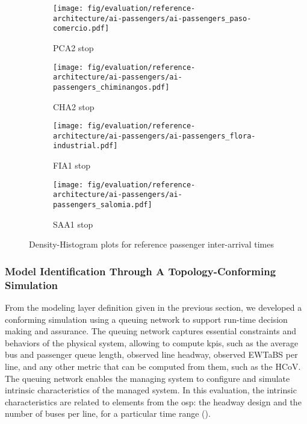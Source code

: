 \begin{figure}[h]
	\centering
	\begin{subfigure}[b]{0.23\textwidth}
		\centering
		\texttt{[image: fig/evaluation/reference-architecture/ai-passengers/ai-passengers\_paso-comercio.pdf]}
		\caption{PCA2 stop}
		\label{tab:evaluation--suts-ai-passengers_PCA2}
	\end{subfigure}
	\begin{subfigure}[b]{0.23\textwidth}
		\centering
		\texttt{[image: fig/evaluation/reference-architecture/ai-passengers/ai-passengers\_chiminangos.pdf]}
		\caption{CHA2 stop}
		\label{tab:evaluation--suts-ai-passengers_CHA2}
	\end{subfigure}
	\begin{subfigure}[b]{0.23\textwidth}
		\centering
		\texttt{[image: fig/evaluation/reference-architecture/ai-passengers/ai-passengers\_flora-industrial.pdf]}
		\caption{FIA1 stop}
		\label{tab:evaluation--suts-ai-passengers_FIA1}
	\end{subfigure}
	\begin{subfigure}[b]{0.23\textwidth}
		\centering
		\texttt{[image: fig/evaluation/reference-architecture/ai-passengers/ai-passengers\_salomia.pdf]}
		\caption{SAA1 stop}
		\label{tab:evaluation--suts-ai-passengers_SAA1}
	\end{subfigure}
	\caption{Density-Histogram plots for reference passenger inter-arrival times}
	\label{tab:evaluation--suts-ai-passengers}
\end{figure}

\subsubsection{Model Identification Through A Topology-Conforming Simulation}
\label{subsubsect:evaluation--suts-model-conforming-simulation}

From the modeling layer definition given in the previous section, we developed a conforming simulation using a queuing network to support run-time decision making and assurance. The queuing network captures essential constraints and behaviors of the physical system, allowing to compute \glspl{kpi}, such as the average bus and passenger queue length, observed line headway, observed \gls{EWTaBS} per line, and any other metric that can be computed from them, such as the \gls{HCoV}. The queuing network enables the managing system to configure and simulate intrinsic characteristics of the managed system. In this evaluation, the intrinsic characteristics are related to elements from the \gls{osp}: the headway design and the number of buses per line, for a particular time range ().

